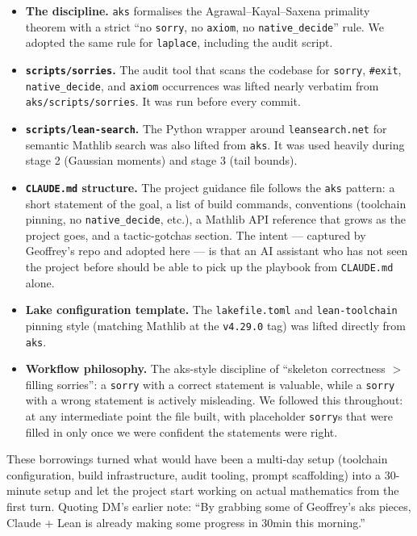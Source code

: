\documentclass[11pt]{article}
\begin{document}
\begin{itemize}
\item \textbf{The discipline.} \texttt{aks} formalises the
Agrawal--Kayal--Saxena primality theorem with a strict ``no
\texttt{sorry}, no \texttt{axiom}, no \texttt{native\_decide}'' rule. We
adopted the same rule for \texttt{laplace}, including the
audit script.
\item \textbf{\texttt{scripts/sorries}.} The audit tool that scans the
codebase for \texttt{sorry}, \texttt{\#exit}, \texttt{native\_decide}, and
\texttt{axiom} occurrences was lifted nearly verbatim from
\texttt{aks/scripts/sorries}. It was run before every commit.
\item \textbf{\texttt{scripts/lean-search}.} The Python wrapper around
\texttt{leansearch.net} for semantic Mathlib search was also lifted from
\texttt{aks}. It was used heavily during stage 2 (Gaussian moments) and
stage 3 (tail bounds).
\item \textbf{\texttt{CLAUDE.md} structure.} The project guidance file
follows the \texttt{aks} pattern: a short statement of the goal, a list of
build commands, conventions (toolchain pinning, no
\texttt{native\_decide}, etc.), a Mathlib API reference that grows as the
project goes, and a tactic-gotchas section. The intent --- captured by
Geoffrey's repo and adopted here --- is that an AI assistant who has not
seen the project before should be able to pick up the playbook from
\texttt{CLAUDE.md} alone.
\item \textbf{Lake configuration template.} The \texttt{lakefile.toml} and
\texttt{lean-toolchain} pinning style (matching Mathlib at the
\texttt{v4.29.0} tag) was lifted directly from \texttt{aks}.
\item \textbf{Workflow philosophy.} The aks-style discipline of
``skeleton correctness $>$ filling sorries'': a \texttt{sorry} with a
correct statement is valuable, while a \texttt{sorry} with a wrong
statement is actively misleading. We followed this throughout: at any
intermediate point the file built, with placeholder \texttt{sorry}s that
were filled in only once we were confident the statements were right.
\end{itemize}

These borrowings turned what would have been a multi-day setup (toolchain
configuration, build infrastructure, audit tooling, prompt scaffolding)
into a 30-minute setup and let the project start working on actual
mathematics from the first turn. Quoting DM's earlier note: ``By grabbing
some of Geoffrey's aks pieces, Claude + Lean is already making some
progress in 30min this morning.''
\end{document}
